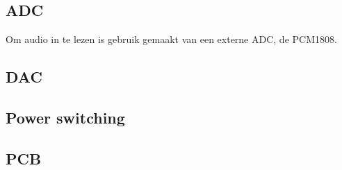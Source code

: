 \subsection{ADC}

Om audio in te lezen is gebruik gemaakt van een externe ADC, de PCM1808.


\subsection{DAC}

\subsection{Power switching}

\subsection{PCB}



